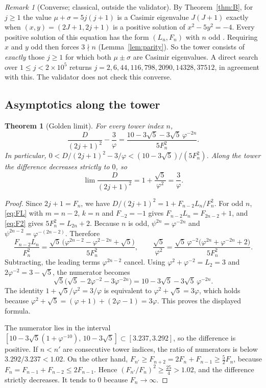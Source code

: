\documentclass[11pt]{amsart}
\newtheorem{theorem}{Theorem}
\theoremstyle{definition}
\theoremstyle{remark}
\newtheorem{remark}[lemma]{Remark}
\begin{document}
\begin{remark}[Converse; classical, outside the validator]\label{rem:converse}
By Theorem~\ref{thm:B}, for $j\ge 1$ the value $\mu+\sigma=5j(j+1)$ is a Casimir eigenvalue $J(J+1)$ exactly when $(x,y)=(2J+1,2j+1)$ is a positive solution of $x^2-5y^2=-4$. Every positive solution of this equation has the form $(L_n,F_n)$ with $n$ odd \cite{Koshy}. Requiring $x$ and $y$ odd then forces $3\nmid n$ (Lemma~\ref{lem:parity}). So the tower consists of \emph{exactly} those $j\ge1$ for which both $\mu\pm\sigma$ are Casimir eigenvalues. A direct search over $1\le j<2\times10^5$ returns $j=2,6,44,116,798,2090,14328,37512$, in agreement with this. The validator does not check this converse.
\end{remark}

\subsection{Asymptotics along the tower}

\begin{theorem}[Golden limit]\label{thm:D}
For every tower index $n$,
\[
\frac{D}{(2j+1)^2}-\frac{3}{\varphi}=\frac{10-3\sqrt5-3\sqrt5\,\varphi^{-2n}}{5F_n^2}.
\]
In particular, $0<D/(2j+1)^2-3/\varphi<(10-3\sqrt5)/(5F_n^2)$. Along the tower the difference decreases strictly to $0$, so
\[
\lim\frac{D}{(2j+1)^2}=1+\frac{\sqrt5}{\varphi^2}=\frac{3}{\varphi}.
\]
\end{theorem}
\begin{proof}
Since $2j+1=F_n$, we have $D/(2j+1)^2=1+F_{n-2}L_n/F_n^2$. For odd $n$, \eqref{eq:FL} with $m=n-2$, $k=n$ and $F_{-2}=-1$ gives $F_{n-2}L_n=F_{2n-2}+1$, and \eqref{eq:F2} gives $5F_n^2=L_{2n}+2$. Because $n$ is odd, $\psi^{2n}=\varphi^{-2n}$ and $\psi^{2n-2}=\varphi^{-(2n-2)}$. Therefore
\[
\frac{F_{n-2}L_n}{F_n^2}=\frac{\sqrt5\,\bigl(\varphi^{2n-2}-\varphi^{2-2n}+\sqrt5\bigr)}{5F_n^2},\qquad
\frac{\sqrt5}{\varphi^2}=\frac{\sqrt5\,\varphi^{-2}\bigl(\varphi^{2n}+\varphi^{-2n}+2\bigr)}{5F_n^2}.
\]
Subtracting, the leading terms $\varphi^{2n-2}$ cancel. Using $\varphi^2+\varphi^{-2}=L_2=3$ and $2\varphi^{-2}=3-\sqrt5$, the numerator becomes
\[
\sqrt5\bigl(\sqrt5-2\varphi^{-2}-3\varphi^{-2n}\bigr)=10-3\sqrt5-3\sqrt5\,\varphi^{-2n}.
\]
The identity $1+\sqrt5/\varphi^2=3/\varphi$ is equivalent to $\varphi^2+\sqrt5=3\varphi$, which holds because $\varphi^2+\sqrt5=(\varphi+1)+(2\varphi-1)=3\varphi$. This proves the displayed formula.

The numerator lies in the interval $[10-3\sqrt5(1+\varphi^{-10}),\,10-3\sqrt5]\subset[3.237,3.292]$, so the difference is positive. If $n<n'$ are consecutive tower indices, the ratio of numerators is below $3.292/3.237<1.02$. On the other hand, $F_{n'}\ge F_{n+2}=2F_n+F_{n-1}\ge\tfrac52F_n$, because $F_n=F_{n-1}+F_{n-2}\le 2F_{n-1}$. Hence $(F_{n'}/F_n)^2\ge\tfrac{25}{4}>1.02$, and the difference strictly decreases. It tends to $0$ because $F_n\to\infty$.
\end{proof}
\end{document}
